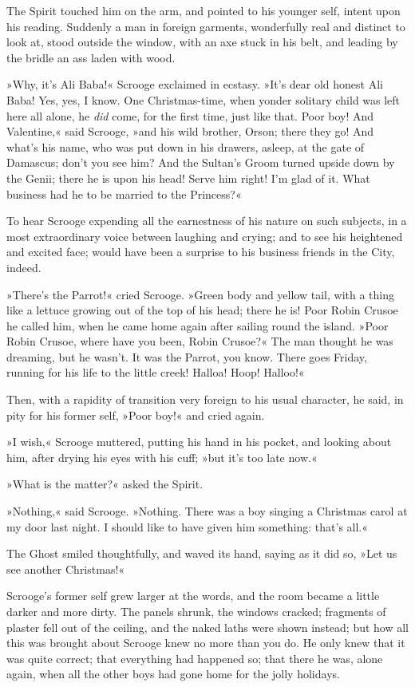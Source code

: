 The Spirit touched him on the arm, and pointed to his younger self, intent upon his reading. Suddenly a man in foreign garments, wonderfully real and distinct to look at, stood outside the window, with an axe stuck in his belt, and leading by the bridle an ass laden with wood.

»Why, it's Ali Baba!« Scrooge exclaimed in ecstasy. »It's dear old honest Ali Baba! Yes, yes, I know. One Christmas-time, when yonder solitary child was left here all alone, he \textit{did} come, for the first time, just like that. Poor boy! And Valentine,« said Scrooge, »and his wild brother, Orson; there they go! And what's his name, who was put down in his drawers, asleep, at the gate of Damascus; don't you see him? And the Sultan's Groom turned upside down by the Genii; there he is upon his head! Serve him right! I'm glad of it. What business had he to be married to the Princess?«

To hear Scrooge expending all the earnestness of his nature on such subjects, in a most extraordinary voice between laughing and crying; and to see his heightened and excited face; would have been a surprise to his business friends in the City, indeed.

»There's the Parrot!« cried Scrooge. »Green body and yellow tail, with a thing like a lettuce growing out of the top of his head; there he is! Poor Robin Crusoe he called him, when he came home again after sailing round the island. »Poor Robin Crusoe, where have you been, Robin Crusoe?« The man thought he was dreaming, but he wasn't. It was the Parrot, you know. There goes Friday, running for his life to the little creek! Halloa! Hoop! Halloo!«

Then, with a rapidity of transition very foreign to his usual character, he said, in pity for his former self, »Poor boy!« and cried again.

»I wish,« Scrooge muttered, putting his hand in his pocket, and looking about him, after drying his eyes with his cuff; »but it's too late now.«

»What is the matter?« asked the Spirit.

»Nothing,« said Scrooge. »Nothing. There was a boy singing a Christmas carol at my door last night. I should like to have given him something: that's all.«

The Ghost smiled thoughtfully, and waved its hand, saying as it did so, »Let us see another Christmas!«

Scrooge's former self grew larger at the words, and the room became a little darker and more dirty. The panels shrunk, the windows cracked; fragments of plaster fell out of the ceiling, and the naked laths were shown instead; but how all this was brought about Scrooge knew no more than you do. He only knew that it was quite correct; that everything had happened so; that there he was, alone again, when all the other boys had gone home for the jolly holidays.

